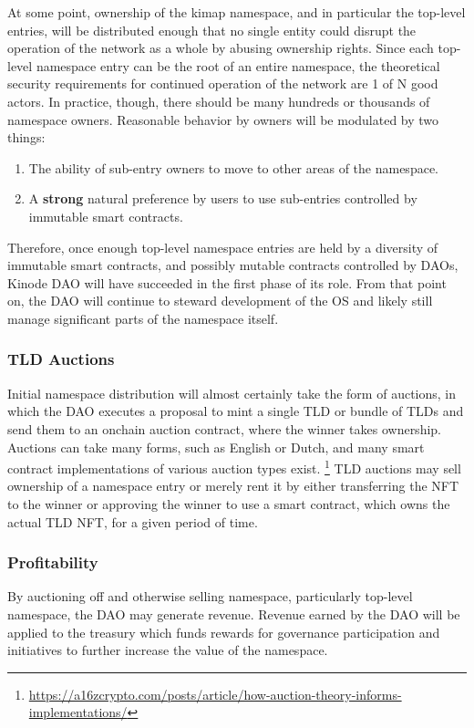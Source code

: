 \documentclass[runningheads]{llncs}
\begin{document}
At some point, ownership of the kimap namespace, and in particular the top-level entries, will be distributed enough that no single entity could disrupt the operation of the network as a whole by abusing ownership rights.
Since each top-level namespace entry can be the root of an entire namespace, the theoretical security requirements for continued operation of the network are 1 of N good actors.
In practice, though, there should be many hundreds or thousands of namespace owners.
Reasonable behavior by owners will be modulated by two things:
\begin{enumerate}
    \item The ability of sub-entry owners to move to other areas of the namespace.
    \item A \textbf{strong} natural preference by users to use sub-entries controlled by immutable smart contracts.
\end{enumerate}

Therefore, once enough top-level namespace entries are held by a diversity of immutable smart contracts, and possibly mutable contracts controlled by DAOs, Kinode DAO will have succeeded in the first phase of its role.
From that point on, the DAO will continue to steward development of the OS and likely still manage significant parts of the namespace itself.

\subsubsection{TLD Auctions}

Initial namespace distribution will almost certainly take the form of auctions, in which the DAO executes a proposal to mint a single TLD or bundle of TLDs and send them to an onchain auction contract, where the winner takes ownership.
Auctions can take many forms, such as English or Dutch, and many smart contract implementations of various auction types exist.
\footnote{\url{https://a16zcrypto.com/posts/article/how-auction-theory-informs-implementations/}}
TLD auctions may sell ownership of a namespace entry or merely rent it by either transferring the NFT to the winner or approving the winner to use a smart contract, which owns the actual TLD NFT, for a given period of time.

\subsubsection{Profitability}

By auctioning off and otherwise selling namespace, particularly top-level namespace, the DAO may generate revenue.
Revenue earned by the DAO will be applied to the treasury which funds rewards for governance participation and initiatives to further increase the value of the namespace.
\end{document}

